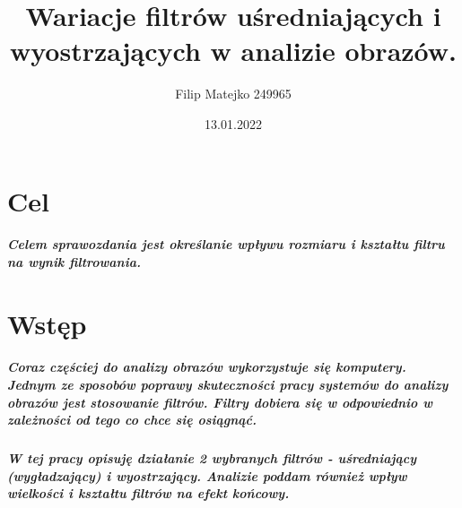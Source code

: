 \documentclass[a4paper,12pt,openany]{report}
\begin{document}
\title{\Large{\textbf{Wariacje filtrów uśredniających i wyostrzających w analizie obrazów.}}}
\author{Filip Matejko 249965}
\date{13.01.2022}
\maketitle

\tableofcontents

\chapter{Cel}

\paragraph{\indent Celem sprawozdania jest określanie wpływu rozmiaru i kształtu filtru na wynik filtrowania.}

\chapter{Wstęp}

\paragraph{\indent Coraz częściej do analizy obrazów wykorzystuje się komputery. Jednym ze sposobów poprawy skuteczności pracy systemów do analizy obrazów jest stosowanie filtrów. Filtry dobiera się w odpowiednio w zależności od tego co chce się osiągnąć.}

\paragraph{\indent W tej pracy opisuję działanie 2 wybranych filtrów - uśredniający (wygładzający) i wyostrzający. Analizie poddam również wpływ wielkości i kształtu filtrów na efekt końcowy.}
\end{document}
